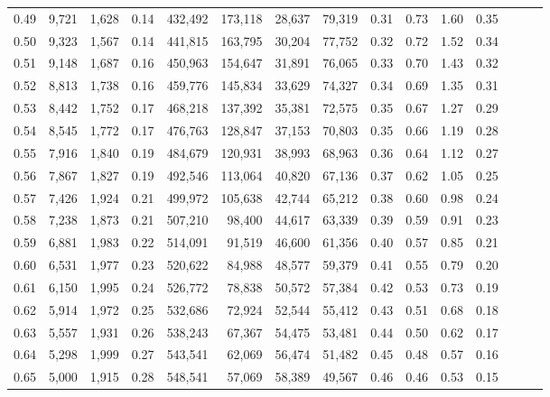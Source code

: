 \begin{tabular}{rrrrrrrrrrrrrrr}
0.49 &   9,721 &  1,628 &  0.14 &  432,492 &  173,118 &   28,637 &   79,319 &  0.31 &  0.73 &  1.60 &      0.35 \\
0.50 &   9,323 &  1,567 &  0.14 &  441,815 &  163,795 &   30,204 &   77,752 &  0.32 &  0.72 &  1.52 &      0.34 \\
0.51 &   9,148 &  1,687 &  0.16 &  450,963 &  154,647 &   31,891 &   76,065 &  0.33 &  0.70 &  1.43 &      0.32 \\
0.52 &   8,813 &  1,738 &  0.16 &  459,776 &  145,834 &   33,629 &   74,327 &  0.34 &  0.69 &  1.35 &      0.31 \\
0.53 &   8,442 &  1,752 &  0.17 &  468,218 &  137,392 &   35,381 &   72,575 &  0.35 &  0.67 &  1.27 &      0.29 \\
0.54 &   8,545 &  1,772 &  0.17 &  476,763 &  128,847 &   37,153 &   70,803 &  0.35 &  0.66 &  1.19 &      0.28 \\
0.55 &   7,916 &  1,840 &  0.19 &  484,679 &  120,931 &   38,993 &   68,963 &  0.36 &  0.64 &  1.12 &      0.27 \\
0.56 &   7,867 &  1,827 &  0.19 &  492,546 &  113,064 &   40,820 &   67,136 &  0.37 &  0.62 &  1.05 &      0.25 \\
0.57 &   7,426 &  1,924 &  0.21 &  499,972 &  105,638 &   42,744 &   65,212 &  0.38 &  0.60 &  0.98 &      0.24 \\
0.58 &   7,238 &  1,873 &  0.21 &  507,210 &   98,400 &   44,617 &   63,339 &  0.39 &  0.59 &  0.91 &      0.23 \\
0.59 &   6,881 &  1,983 &  0.22 &  514,091 &   91,519 &   46,600 &   61,356 &  0.40 &  0.57 &  0.85 &      0.21 \\
0.60 &   6,531 &  1,977 &  0.23 &  520,622 &   84,988 &   48,577 &   59,379 &  0.41 &  0.55 &  0.79 &      0.20 \\
0.61 &   6,150 &  1,995 &  0.24 &  526,772 &   78,838 &   50,572 &   57,384 &  0.42 &  0.53 &  0.73 &      0.19 \\
0.62 &   5,914 &  1,972 &  0.25 &  532,686 &   72,924 &   52,544 &   55,412 &  0.43 &  0.51 &  0.68 &      0.18 \\
0.63 &   5,557 &  1,931 &  0.26 &  538,243 &   67,367 &   54,475 &   53,481 &  0.44 &  0.50 &  0.62 &      0.17 \\
0.64 &   5,298 &  1,999 &  0.27 &  543,541 &   62,069 &   56,474 &   51,482 &  0.45 &  0.48 &  0.57 &      0.16 \\
0.65 &   5,000 &  1,915 &  0.28 &  548,541 &   57,069 &   58,389 &   49,567 &  0.46 &  0.46 &  0.53 &      0.15 \\

\end{tabular}
